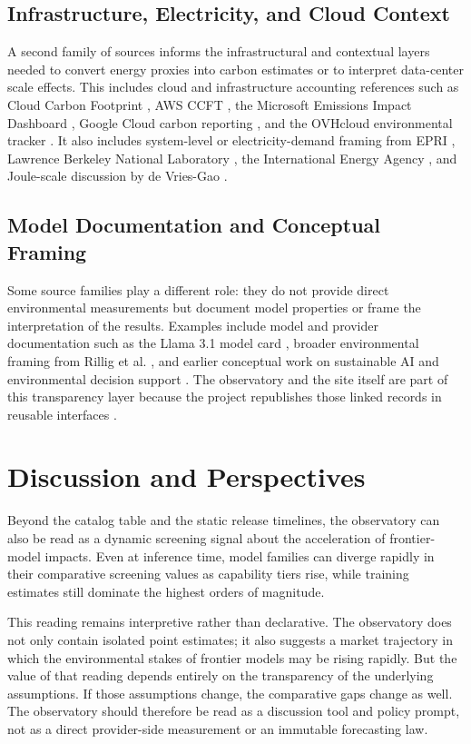\documentclass[runningheads]{llncs}
\begin{document}
\subsection{Infrastructure, Electricity, and Cloud Context}
A second family of sources informs the infrastructural and contextual layers needed to convert energy proxies into carbon estimates or to interpret data-center scale effects. This includes cloud and infrastructure accounting references such as Cloud Carbon Footprint \cite{cloudcarbonfootprint2026}, AWS CCFT \cite{awsccft2026}, the Microsoft Emissions Impact Dashboard \cite{azureeid2026}, Google Cloud carbon reporting \cite{gcloudcarbon2026}, and the OVHcloud environmental tracker \cite{ovhtracker2024}. It also includes system-level or electricity-demand framing from EPRI \cite{epri2024}, Lawrence Berkeley National Laboratory \cite{lbl2025,shehabi2024report}, the International Energy Agency \cite{iea2025}, and Joule-scale discussion by de Vries-Gao \cite{devriesgao2025joule}.

\subsection{Model Documentation and Conceptual Framing}
Some source families play a different role: they do not provide direct environmental measurements but document model properties or frame the interpretation of the results. Examples include model and provider documentation such as the Llama 3.1 model card \cite{meta2024llama}, broader environmental framing from Rillig et al. \cite{rillig2023}, and earlier conceptual work on sustainable AI and environmental decision support \cite{pachot2022book,pachot2023sustainableai}. The observatory and the site itself are part of this transparency layer because the project republishes those linked records in reusable interfaces \cite{impactllmrepo2026}.

\section{Discussion and Perspectives}
Beyond the catalog table and the static release timelines, the observatory can also be read as a dynamic screening signal about the acceleration of frontier-model impacts. Even at inference time, model families can diverge rapidly in their comparative screening values as capability tiers rise, while training estimates still dominate the highest orders of magnitude.

This reading remains interpretive rather than declarative. The observatory does not only contain isolated point estimates; it also suggests a market trajectory in which the environmental stakes of frontier models may be rising rapidly. But the value of that reading depends entirely on the transparency of the underlying assumptions. If those assumptions change, the comparative gaps change as well. The observatory should therefore be read as a discussion tool and policy prompt, not as a direct provider-side measurement or an immutable forecasting law.
\end{document}
